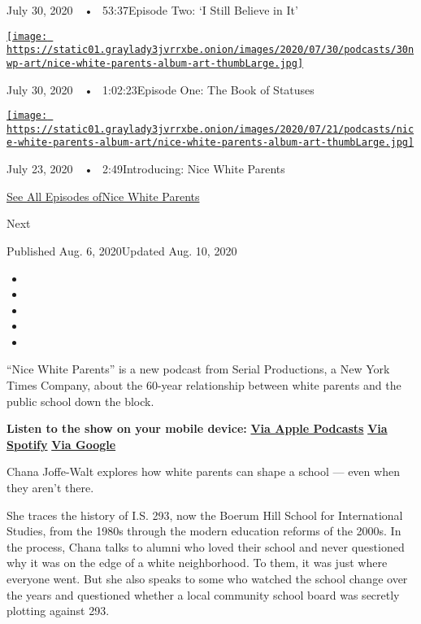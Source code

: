 July 30, 2020~~•~ 53:37Episode Two: `I Still Believe in It'

\href{https://www.nytimes3xbfgragh.onion/2020/07/30/podcasts/nice-white-parents-serial.html?action=click\&module=audio-series-bar\&region=header\&pgtype=Article}{\texttt{[image: https://static01.graylady3jvrrxbe.onion/images/2020/07/30/podcasts/30nwp-art/nice-white-parents-album-art-thumbLarge.jpg]}}

July 30, 2020~~•~ 1:02:23Episode One: The Book of Statuses

\href{https://www.nytimes3xbfgragh.onion/2020/07/23/podcasts/nice-white-parents-serial.html?action=click\&module=audio-series-bar\&region=header\&pgtype=Article}{\texttt{[image: https://static01.graylady3jvrrxbe.onion/images/2020/07/21/podcasts/nice-white-parents-album-art/nice-white-parents-album-art-thumbLarge.jpg]}}

July 23, 2020~~•~ 2:49Introducing: Nice White Parents

\href{https://www.nytimes3xbfgragh.onion/column/nice-white-parents}{See
All Episodes ofNice White Parents}

Next

Published Aug. 6, 2020Updated Aug. 10, 2020

\begin{itemize}
\item
\item
\item
\item
\item
\end{itemize}

``Nice White Parents'' is a new podcast from Serial Productions, a New
York Times Company, about the 60-year relationship between white parents
and the public school down the block.

\textbf{Listen to the show on your mobile device:}
\textbf{\href{https://podcasts.apple.com/us/podcast/nice-white-parents/id1524080195}{Via
Apple Podcasts}} \textbf{\textbar{}}
\textbf{\href{https://open.spotify.com/show/7oBSLCZFCgpdCaBjIG8mLV?si=YcEPLD3xT2ejXmpQz-tRpw}{Via
Spotify}} \textbf{\textbar{}}
\textbf{\href{https://podcasts.google.com/feed/aHR0cHM6Ly9yc3MuYXJ0MTkuY29tL25pY2Utd2hpdGUtcGFyZW50cw}{Via
Google}}

Chana Joffe-Walt explores how white parents can shape a school --- even
when they aren't there.

She traces the history of I.S. 293, now the Boerum Hill School for
International Studies, from the 1980s through the modern education
reforms of the 2000s. In the process, Chana talks to alumni who loved
their school and never questioned why it was on the edge of a white
neighborhood. To them, it was just where everyone went. But she also
speaks to some who watched the school change over the years and
questioned whether a local community school board was secretly plotting
against 293.

